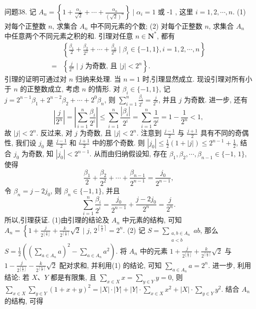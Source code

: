问题38. 记 $A_n=\left\{1+\frac{\alpha_1}{\sqrt{2}}+\cdots+\frac{\alpha_n}{(\sqrt{2})^n}\right\} \mid \alpha_i=1$ 或 -1 , 这里 $i=1,2, \cdots, n$.
(1) 对每个正整数 $n$, 求集合 $A_n$ 中不同元素的个数;
(2) 对每个正整数 $n$, 求集合 $A_n$ 中任意两个不同元素之积的和.
引理对任意 $n \in \mathbf{N}^*$, 都有
$$
\begin{aligned}
& \left\{\frac{\beta_1}{2}+\frac{\beta_2}{2^2}+\cdots+\frac{\beta_n}{2^n} \mid \beta_i \in\{-1,1\}, i=1,2, \cdots, n\right\} \\
= & \left\{\frac{j}{2^n} \mid j \text { 为奇数, 且 }|j|<2^n\right\} .
\end{aligned}
$$
引理的证明可通过对 $n$ 归纳来处理.
当 $n=1$ 时,引理显然成立.
现设引理对所有小于 $n$ 的正整数成立, 考虑 $n$ 的情形.
对 $\beta_i \in\{-1,1\}$, 记 $j=2^{n-1} \beta_1+2^{n-2} \beta_2+\cdots+2^0 \beta_n$, 则 $\sum_{i=1}^n \frac{\beta_i}{2^i}=\frac{j}{2^n}$, 并且 $j$ 为奇数.
进一步, 还有
$$
\left|\frac{j}{2^n}\right|=\left|\sum_{i=1}^n \frac{\beta_i}{2^i}\right| \leqslant \sum_{i=1}^n \frac{\left|\beta_i\right|}{2^i}=\sum_{i=1}^n \frac{1}{2^i}=1-\frac{1}{2^n}<1,
$$
故 $|j|<2^n$.
反过来, 对 $j$ 为奇数, 且 $|j|<2^n$. 注意到 $\frac{j-1}{2}$ 与 $\frac{j+1}{2}$ 具有不同的奇偶性, 我们设 $j_0$ 是 $\frac{j-1}{2}$ 和 $\frac{j+1}{2}$ 中的那个奇数.
则 $\left|j_0\right| \leqslant \frac{1}{2}(1+|j|) \leqslant 2^{n-1}+\frac{1}{2}$, 结合 $j_0$ 为奇数, 知 $\left|j_0\right|<2^{n-1}$. 从而由归纳假设知, 存在 $\beta_1, \beta_2, \cdots, \beta_{n-1} \in\{-1$, $1\}$, 使得
$$
\frac{\beta_1}{2}+\frac{\beta_2}{2^2}+\cdots+\frac{\beta_{n-1}}{2^{n-1}}=\frac{j_0}{2^{n-1}},
$$
令 $\beta_n=j-2 j_0$, 则 $\beta_n \in\{-1,1\}$, 并且
$$
\sum_{i=1}^n \frac{\beta_i}{2^i}=\frac{j_0}{2^{n-1}}+\frac{j-2 j_0}{2^n}=\frac{j}{2^n} .
$$
所以,引理获证.
(1)由引理的结论及 $A_n$ 中元素的结构, 可知 $A_n=\left\{1+\frac{j}{2^{\left\lfloor\frac{n}{2}\right\rfloor}}+\frac{k}{2^{\left\lceil\frac{n}{2}\right\rceil}} \sqrt{2} \mid j\right.$, $2^{\left\lceil\frac{n}{2}\right\rceil}=2^n$.
(2) 记 $S=\sum_{\substack{a, b \in A_n \\ a<b}} a b$, 那么 $S=\frac{1}{2}\left(\left(\sum_{a \in A_n} a\right)^2-\sum_{a \in A_n} a^2\right)$.
将 $A_n$ 中的元素 $1+\frac{j}{2^{\left\lfloor\frac{n}{2}\right\rfloor}}+\frac{k}{2^{\left\lceil\frac{n}{2}\right\rceil}} \sqrt{2}$ 与 $1-\frac{j}{2^{\left\lfloor\frac{n}{2}\right\rfloor}}-\frac{k}{2^{\left\lceil\frac{n}{2}\right\rceil}} \sqrt{2}$ 配对求和, 并利用(1) 的结论, 可知 $\sum_{a \in A_n} a=2^n$.
进一步, 利用结论: 若 $X 、 Y$ 都是有限集, 且 $\sum_{x \in X} x=\sum_{y \in Y} y=0$, 则 $\sum_{x \in X} \sum_{y \in Y}(1+x+y)^2=|X| \cdot|Y|+|Y| \cdot \sum_{x \in X} x^2+|X| \cdot \sum_{y \in Y} y^2$. 结合 $A_n$ 的结构, 可得
